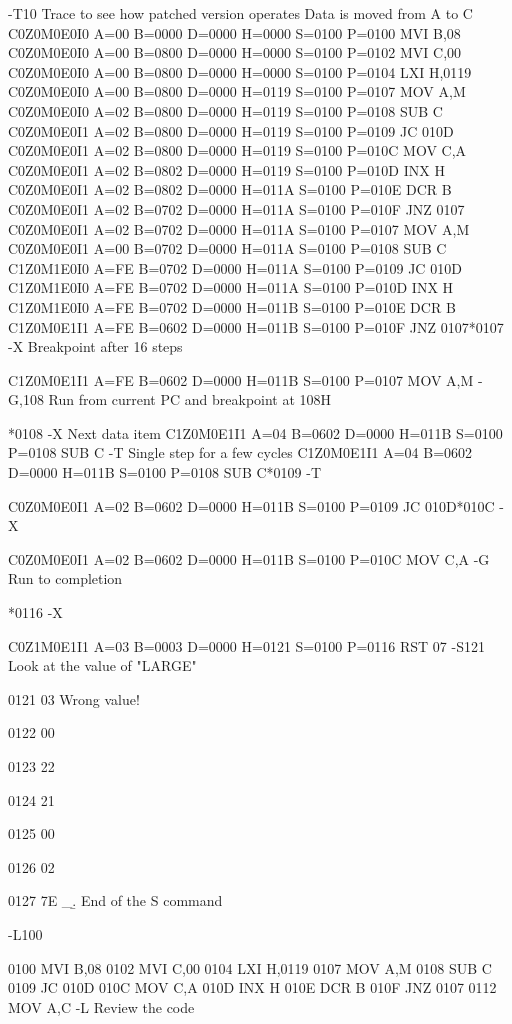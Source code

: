 -T10
     Trace to see how patched version operates    Data is moved from A to C
C0Z0M0E0I0 A=00 B=0000 D=0000 H=0000 S=0100 P=0100 MVI B,08
C0Z0M0E0I0 A=00 B=0800 D=0000 H=0000 S=0100 P=0102 MVI C,00
C0Z0M0E0I0 A=00 B=0800 D=0000 H=0000 S=0100 P=0104 LXI H,0119
C0Z0M0E0I0 A=00 B=0800 D=0000 H=0119 S=0100 P=0107 MOV A,M
C0Z0M0E0I0 A=02 B=0800 D=0000 H=0119 S=0100 P=0108 SUB C
C0Z0M0E0I1 A=02 B=0800 D=0000 H=0119 S=0100 P=0109 JC  010D
C0Z0M0E0I1 A=02 B=0800 D=0000 H=0119 S=0100 P=010C MOV C,A
C0Z0M0E0I1 A=02 B=0802 D=0000 H=0119 S=0100 P=010D INX H
C0Z0M0E0I1 A=02 B=0802 D=0000 H=011A S=0100 P=010E DCR B
C0Z0M0E0I1 A=02 B=0702 D=0000 H=011A S=0100 P=010F JNZ 0107
C0Z0M0E0I1 A=02 B=0702 D=0000 H=011A S=0100 P=0107 MOV A,M
C0Z0M0E0I1 A=00 B=0702 D=0000 H=011A S=0100 P=0108 SUB C
C1Z0M1E0I0 A=FE B=0702 D=0000 H=011A S=0100 P=0109 JC  010D
C1Z0M1E0I0 A=FE B=0702 D=0000 H=011A S=0100 P=010D INX H
C1Z0M1E0I0 A=FE B=0702 D=0000 H=011B S=0100 P=010E DCR B
C1Z0M0E1I1 A=FE B=0602 D=0000 H=011B S=0100 P=010F JNZ 0107*0107
-X                                  Breakpoint after 16 steps

C1Z0M0E1I1 A=FE B=0602 D=0000 H=011B S=0100 P=0107 MOV A,M
-G,108   Run from current PC and breakpoint at 108H

*0108
-X
                Next data item
C1Z0M0E1I1 A=04 B=0602 D=0000 H=011B S=0100 P=0108 SUB C
-T
    Single step for a few cycles
C1Z0M0E1I1 A=04 B=0602 D=0000 H=011B S=0100 P=0108 SUB C*0109
-T

C0Z0M0E0I1 A=02 B=0602 D=0000 H=011B S=0100 P=0109 JC 010D*010C
-X

C0Z0M0E0I1 A=02 B=0602 D=0000 H=011B S=0100 P=010C MOV C,A
-G   Run to completion

*0116
-X

C0Z1M0E1I1 A=03 B=0003 D=0000 H=0121 S=0100 P=0116 RST 07
-S121   Look at the value of "LARGE"

 0121   03   Wrong value!

 0122   00

 0123   22

 0124   21

 0125   00

 0126   02

 0127   7E  _\b.    End of the S command

-L100

 0100   MVI        B,08
 0102   MVI        C,00
 0104   LXI        H,0119
 0107   MOV        A,M
 0108   SUB        C
 0109   JC         010D
 010C   MOV        C,A
 010D   INX        H
 010E   DCR        B
 010F   JNZ        0107
 0112   MOV        A,C
-L                            Review the code

